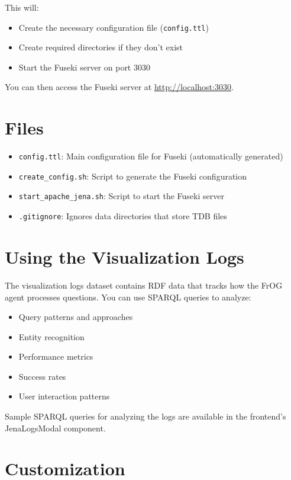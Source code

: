 This will:
\begin{itemize}
    \item Create the necessary configuration file (\texttt{config.ttl})
    \item Create required directories if they don't exist
    \item Start the Fuseki server on port 3030
\end{itemize}

You can then access the Fuseki server at \url{http://localhost:3030}.

\section*{Files}

\begin{itemize}
    \item \texttt{config.ttl}: Main configuration file for Fuseki (automatically generated)
    \item \texttt{create\_config.sh}: Script to generate the Fuseki configuration
    \item \texttt{start\_apache\_jena.sh}: Script to start the Fuseki server
    \item \texttt{.gitignore}: Ignores data directories that store TDB files
\end{itemize}

\section*{Using the Visualization Logs}

The visualization logs dataset contains RDF data that tracks how the FrOG agent processes questions. You can use SPARQL queries to analyze:

\begin{itemize}
    \item Query patterns and approaches
    \item Entity recognition
    \item Performance metrics
    \item Success rates
    \item User interaction patterns
\end{itemize}

Sample SPARQL queries for analyzing the logs are available in the frontend's JenaLogsModal component.

\section*{Customization}

